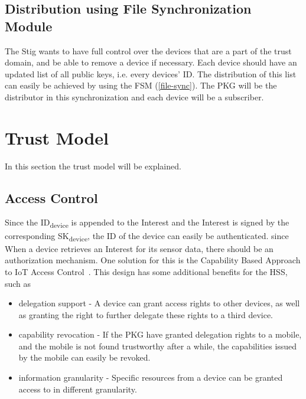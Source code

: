 
\subsection{Distribution using File Synchronization Module}

The Stig wants to have full control over the devices that are a part of the trust domain, and be able to remove a device if necessary.
Each device should have an updated list of all public keys, i.e. every devices' \gls{ID}.
The distribution of this list can easily be achieved by using the \gls{FSM} (\autoref{file-sync}).
The \gls{PKG} will be the distributor in this synchronization and each device will be a subscriber.


\section{Trust Model}
In this section the trust model will be explained. 

\subsection{Access Control}\label{access_control}
Since the ID\textsubscript{device} is appended to the Interest and the Interest is signed by the corresponding SK\textsubscript{device}, the \gls{ID} of the device can easily be authenticated. 
since 
When a device retrieves an Interest for its sensor data, there should be an authorization mechanism. 
One solution for this is the Capability Based Approach to \gls{IoT} Access Control~\cite{DBLP:conf/imis/GusmeroliPR12}.
This design has some additional benefits for the \gls{HSS}, such as

\begin{itemize}
  \item delegation support - 
  A device can grant access rights to other devices, as well as granting the right to further delegate these rights to a third device.
  \item capability revocation - 
  If the \gls{PKG} have granted delegation rights to a mobile, and the mobile is not found trustworthy after a while, the capabilities issued by the mobile can easily be revoked.
  \item information granularity - 
  Specific resources from a device can be granted access to in different granularity.
\end{itemize}


